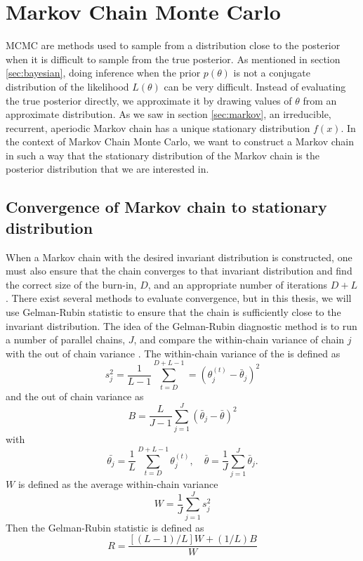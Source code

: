 \section{Markov Chain Monte Carlo}
MCMC are  methods used to sample from a distribution close to the posterior when it is difficult to sample from the true posterior. As mentioned in section \ref{sec:bayesian}, 
doing inference when the prior $p\left(\theta\right)$ is not a conjugate distribution of the likelihood $L\left(\theta\right)$ can be very difficult.
Instead of evaluating the true posterior directly, we approximate it by drawing values of $\theta$ from an approximate distribution. 
As we saw in  section \ref{sec:markov}, an irreducible, recurrent, aperiodic Markov chain has a unique stationary distribution $f(x)$.
In the context of Markov Chain Monte Carlo, we want to construct a Markov chain in such a way that the stationary distribution of the Markov chain is the posterior distribution that we are interested in. 
\subsection{Convergence of Markov chain to stationary distribution}\label{sec:convergence}
When a Markov chain with the desired invariant distribution is constructed, one must also ensure that the chain converges to that invariant distribution and find the correct size of the burn-in, $D$, and an appropriate number of iterations $D+L$. There exist several  methods to evaluate convergence, but in this thesis, we will use Gelman-Rubin statistic to ensure that the chain is sufficiently close to the invariant distribution. The idea of the Gelman-Rubin diagnostic method is to run a number of parallel chains, $J$, and compare the within-chain variance of chain $j$ with the out of chain variance \cite{CS}. The within-chain variance of the is defined as 
\begin{equation*}
    s_j^2 = \frac{1}{L-1}\sum_{t = D}^{D + L - 1} = \left(\theta_j^{\left(t\right)} - \bar{\theta}_j\right)^2
\end{equation*}
and the out of chain variance as 
\begin{equation*}
    B = \frac{L}{J-1}\sum_{j=1}^J \left(\bar{\theta}_j - \bar{\theta}\right)^2
\end{equation*}
with 
\begin{equation*}
    \bar{\theta_j} = \frac{1}{L}\sum_{t = D}^{D+L-1} \theta_j^{\left(t\right)}, \quad \bar{\theta} = \frac{1}{J} \sum_{j=1}^J \bar{\theta}_j.
\end{equation*} 
$W$ is defined as the average within-chain variance 
\begin{equation*}
    W = \frac{1}{J} \sum_{j = 1}^J{s_j^2}
\end{equation*}
Then the Gelman-Rubin statistic is defined as 
\begin{equation}\label{eq:Gelman-Rubin}
    R = \frac{\left[\left(L-1\right)/L\right]W + \left(1/L\right)B}{W}
\end{equation}

